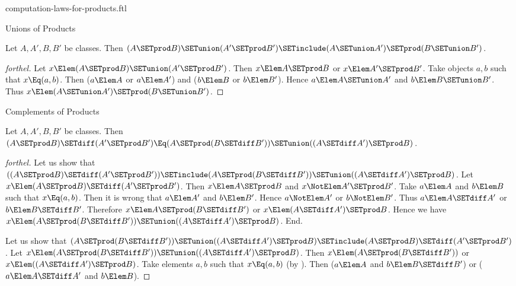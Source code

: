 \documentclass{stex}
\begin{document}
\begin{smodule}{computation-laws-for-products.ftl}
\begin{sfragment}{Unions of Products}
  \begin{proposition}[forthel,id=FOUNDATIONS_05_7090174334861312]
    Let $A, A', B, B'$ be classes.
    Then $(A \SETprod B) \SETunion (A' \SETprod B') \SETinclude (A \SETunion A') \SETprod (B \SETunion B')$.
  \end{proposition}
  \begin{proof}[forthel]
    Let $x \Elem (A \SETprod B) \SETunion (A' \SETprod B')$.
    Then $x \Elem A \SETprod B$ or $x \Elem A' \SETprod B'$.
    Take objects $a, b$ such that $x \Eq (a, b)$.
    Then ($a \Elem A$ or $a \Elem A'$) and ($b \Elem B$ or $b \Elem B'$).
    Hence $a \Elem A \SETunion A'$ and $b \Elem B \SETunion B'$.
    Thus $x \Elem (A \SETunion A') \SETprod (B \SETunion B')$.
  \end{proof}
\end{sfragment}

\begin{sfragment}{Complements of Products}
  \begin{proposition}[forthel,id=FOUNDATIONS_05_5552125989879808]
    Let $A, A', B, B'$ be classes.
    Then $(A \SETprod B) \SETdiff (A' \SETprod B') \Eq (A \SETprod (B \SETdiff B')) \SETunion ((A \SETdiff A') \SETprod B)$.
  \end{proposition}
  \begin{proof}[forthel]
    Let us show that $((A \SETprod B) \SETdiff (A' \SETprod B')) \SETinclude (A \SETprod (B \SETdiff B')) \SETunion ((A \SETdiff A') \SETprod B)$.
      Let $x \Elem (A \SETprod B) \SETdiff (A' \SETprod B')$.
      Then $x \Elem A \SETprod B$ and $x \NotElem A' \SETprod B'$.
      Take $a \Elem A$ and $b \Elem B$ such that $x \Eq (a, b)$.
      Then it is wrong that $a \Elem A'$ and $b \Elem B'$.
      Hence $a \NotElem A'$ or $b \NotElem B'$.
      Thus $a \Elem A \SETdiff A'$ or $b \Elem B \SETdiff B'$.
      Therefore $x \Elem A \SETprod (B \SETdiff B')$ or $x \Elem (A \SETdiff A') \SETprod B$.
      Hence we have $x \Elem (A \SETprod (B \SETdiff B')) \SETunion ((A \SETdiff A') \SETprod B)$.
    End.

    Let us show that $(A \SETprod (B \SETdiff B')) \SETunion ((A \SETdiff A') \SETprod B) \SETinclude (A \SETprod B) \SETdiff (A' \SETprod B')$.
      Let $x \Elem (A \SETprod (B \SETdiff B')) \SETunion ((A \SETdiff A') \SETprod B)$.
      Then $x \Elem (A \SETprod (B \SETdiff B'))$ or $x \Elem ((A \SETdiff A') \SETprod B)$.
      Take elements $a,b$ such that $x \Eq (a, b)$ (by ).
      Then ($a \Elem A$ and $b \Elem B \SETdiff B'$) or ($a \Elem A \SETdiff A'$ and $b \Elem B$).


\end{proof}
\end{sfragment}
\end{smodule}
\end{document}
